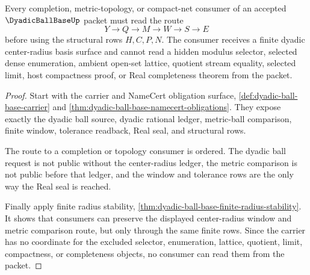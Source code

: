 \begin{theorem}
\label{thm:dyadic-ball-base-nonescape}
Every completion, metric-topology, or compact-net consumer of an accepted $\DyadicBallBaseUp$ packet must read the route
$$
Y \to Q \to M \to W \to S \to E
$$
before using the structural rows $H,C,P,N$. The consumer receives a finite dyadic center-radius basis surface and cannot read a hidden modulus selector, selected dense enumeration, ambient open-set lattice, quotient stream equality, selected limit, host compactness proof, or Real completeness theorem from the packet.
\end{theorem}
\begin{proof}
Start with the carrier and NameCert obligation surface, \autoref{def:dyadic-ball-base-carrier} and \autoref{thm:dyadic-ball-base-namecert-obligations}. They expose exactly the dyadic ball source, dyadic rational ledger, metric-ball comparison, finite window, tolerance readback, Real seal, and structural rows.

The route to a completion or topology consumer is ordered. The dyadic ball request is not public without the center-radius ledger, the metric comparison is not public before that ledger, and the window and tolerance rows are the only way the Real seal is reached.

Finally apply finite radius stability, \autoref{thm:dyadic-ball-base-finite-radius-stability}. It shows that consumers can preserve the displayed center-radius window and metric comparison route, but only through the same finite rows. Since the carrier has no coordinate for the excluded selector, enumeration, lattice, quotient, limit, compactness, or completeness objects, no consumer can read them from the packet.
\end{proof}



